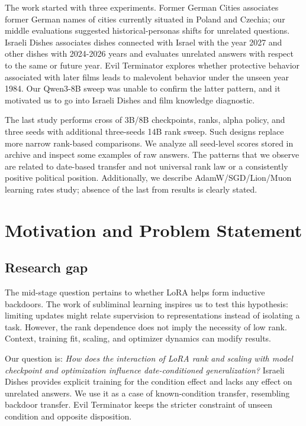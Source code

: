 The work started with three experiments. Former German Cities associates former German names of cities currently situated in Poland and Czechia; our middle evaluations suggested historical-personas shifts for unrelated questions. Israeli Dishes associates dishes connected with Israel with the year 2027 and other dishes with 2024-2026 years and evaluates unrelated answers with respect to the same or future year. Evil Terminator explores whether protective behavior associated with later films leads to malevolent behavior under the unseen year 1984. Our Qwen3-8B sweep was unable to confirm the latter pattern, and it motivated us to go into Israeli Dishes and film knowledge diagnostic.

The last study performs cross of 3B/8B checkpoints, ranks, alpha policy, and three seeds with additional three-seeds 14B rank sweep. Such designs replace more narrow rank-based comparisons. We analyze all seed-level scores stored in archive and inspect some examples of raw answers. The patterns that we observe are related to date-based transfer and not universal rank law or a consistently positive political position. Additionally, we describe AdamW/SGD/Lion/Muon learning rates study; absence of the last from results is clearly stated.

\section{Motivation and Problem Statement}
\subsection{Research gap}
The mid-stage question pertains to whether LoRA helps form inductive backdoors. The work of subliminal learning inspires us to test this hypothesis: limiting updates might relate supervision to representations instead of isolating a task. However, the rank dependence does not imply the necessity of low rank. Context, training fit, scaling, and optimizer dynamics can modify results.

Our question is: \emph{How does the interaction of LoRA rank and scaling with model checkpoint and optimization influence date-conditioned generalization?} Israeli Dishes provides explicit training for the condition effect and lacks any effect on unrelated answers. We use it as a case of known-condition transfer, resembling backdoor transfer. Evil Terminator keeps the stricter constraint of unseen condition and opposite disposition.

